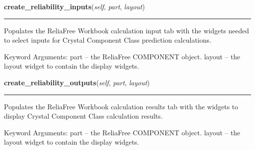     \label{reliafree:miscellaneous:crystal:Crystal:create_reliability_inputs}

    \vspace{0.5ex}

\hspace{.8\funcindent}\begin{boxedminipage}{\funcwidth}

    \raggedright \textbf{create\_reliability\_inputs}(\textit{self}, \textit{part}, \textit{layout})

    \vspace{-1.5ex}

    \rule{\textwidth}{0.5\fboxrule}
\setlength{\parskip}{2ex}
    Populates the ReliaFree Workbook calculation input tab with the widgets
    needed to select inputs for Crystal Component Class prediction 
    calculations.

    Keyword Arguments: part   -- the ReliaFree COMPONENT object. layout -- 
    the layout widget to contain the display widgets.

\setlength{\parskip}{1ex}
    \end{boxedminipage}

    \label{reliafree:miscellaneous:crystal:Crystal:create_reliability_outputs}

    \vspace{0.5ex}

\hspace{.8\funcindent}\begin{boxedminipage}{\funcwidth}

    \raggedright \textbf{create\_reliability\_outputs}(\textit{self}, \textit{part}, \textit{layout})

    \vspace{-1.5ex}

    \rule{\textwidth}{0.5\fboxrule}
\setlength{\parskip}{2ex}
    Populates the ReliaFree Workbook calculation results tab with the 
    widgets to display Crystal Component Class calculation results.

    Keyword Arguments: part   -- the ReliaFree COMPONENT object. layout -- 
    the layout widget to contain the display widgets.

\setlength{\parskip}{1ex}
    \end{boxedminipage}

